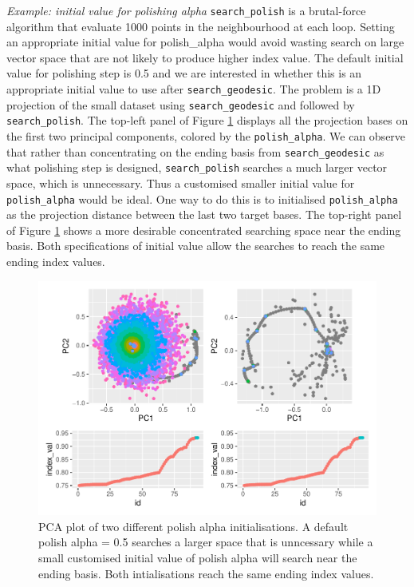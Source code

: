 \documentclass[12pt]{article}
\begin{document}
\emph{Example: initial value for polishing alpha}
\texttt{search\_polish} is a brutal-force algorithm that evaluate 1000
points in the neighbourhood at each loop. Setting an appropriate initial
value for polish\_alpha would avoid wasting search on large vector space
that are not likely to produce higher index value. The default initial
value for polishing step is 0.5 and we are interested in whether this is
an appropriate initial value to use after \texttt{search\_geodesic}. The
problem is a 1D projection of the small dataset using
\texttt{search\_geodesic} and followed by \texttt{search\_polish}. The
top-left panel of Figure \ref{polish-alpha} displays all the projection
bases on the first two principal components, colored by the
\texttt{polish\_alpha}. We can observe that rather than concentrating on
the ending basis from \texttt{search\_geodesic} as what polishing step
is designed, \texttt{search\_polish} searches a much larger vector
space, which is unnecessary. Thus a customised smaller initial value for
\texttt{polish\_alpha} would be ideal. One way to do this is to
initialised \texttt{polish\_alpha} as the projection distance between
the last two target bases. The top-right panel of Figure
\ref{polish-alpha} shows a more desirable concentrated searching space
near the ending basis. Both specifications of initial value allow the
searches to reach the same ending index values.

\begin{figure}
\centering
\includegraphics{paper_files/figure-latex/polish-alpha-1.pdf}
\caption{\label{polish-alpha}PCA plot of two different polish alpha
initialisations. A default polish alpha = 0.5 searches a larger space
that is unncessary while a small customised initial value of polish
alpha will search near the ending basis. Both intialisations reach the
same ending index values.}
\end{figure}
\end{document}
